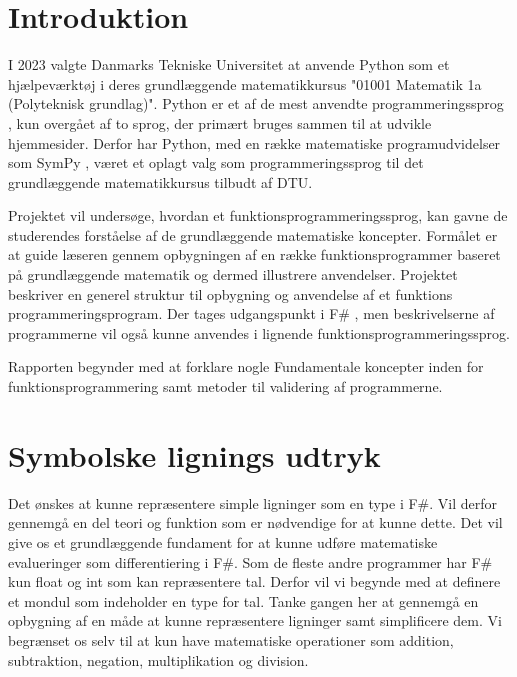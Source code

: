 \documentclass{article}
\begin{document}

\tableofcontents
\newpage
\section{Introduktion}


I 2023 valgte Danmarks Tekniske Universitet at anvende Python som et hjælpeværktøj i deres grundlæggende matematikkursus "01001 Matematik 1a (Polyteknisk grundlag)". Python er et af de mest anvendte programmeringssprog , kun overgået af to sprog, der primært bruges sammen til at udvikle hjemmesider. Derfor har Python, med en række matematiske programudvidelser som SymPy , været et oplagt valg som programmeringssprog til det grundlæggende matematikkursus tilbudt af DTU.

Projektet vil undersøge, hvordan et funktionsprogrammeringssprog, kan gavne de studerendes forståelse af de grundlæggende matematiske koncepter. Formålet er at guide læseren gennem opbygningen af en række funktionsprogrammer baseret på grundlæggende matematik  og dermed illustrere anvendelser. Projektet beskriver en generel struktur til opbygning og anvendelse af et funktions programmeringsprogram. Der tages udgangspunkt i F\# , men beskrivelserne af programmerne vil også kunne anvendes i lignende funktionsprogrammeringssprog.

Rapporten begynder med at forklare nogle Fundamentale koncepter inden for funktionsprogrammering samt metoder til validering af programmerne. 



\section{Symbolske lignings udtryk}
Det ønskes at kunne repræsentere simple ligninger som en type i F\#. Vil derfor gennemgå en del teori og funktion som er nødvendige for at kunne dette. Det vil give os et grundlæggende fundament for at kunne udføre matematiske evalueringer som differentiering i F\#. Som de fleste andre programmer har F\# kun float og int som kan repræsentere tal. Derfor vil vi begynde med at definere et mondul som indeholder en type for tal. Tanke gangen her at gennemgå en opbygning af en måde at kunne repræsentere ligninger samt simplificere dem. Vi begrænset os selv til at kun have matematiske operationer som addition, subtraktion, negation, multiplikation og division.
\end{document}
